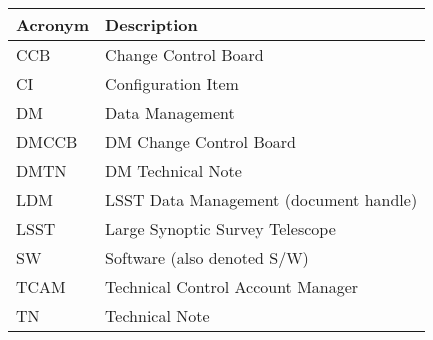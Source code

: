 \addtocounter{table}{-1}
\begin{longtable}{|l|p{}|}\hline
\textbf{Acronym} & \textbf{Description}  \\\hline

CCB & Change Control Board \\\hline
CI & Configuration Item \\\hline
DM & Data Management \\\hline
DMCCB & DM Change Control Board \\\hline
DMTN & DM Technical Note \\\hline
LDM & LSST Data Management (document handle) \\\hline
LSST & Large Synoptic Survey Telescope \\\hline
SW & Software (also denoted S/W) \\\hline
TCAM & Technical Control Account Manager \\\hline
TN & Technical Note \\\hline
\end{longtable}

